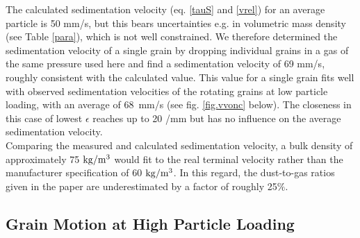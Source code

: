 The calculated sedimentation velocity {(eq. \ref{tauS} and \ref{vrel})} for an average particle is 50 mm/s, but this bears uncertainties e.g. in {volumetric mass density (see Table \ref{para})}, which is not well constrained. We therefore determined the sedimentation velocity of a single grain by dropping individual grains in a gas of the same pressure used here and find a sedimentation velocity of 69 mm/s, roughly consistent with the calculated value. This value for a single grain fits well with observed sedimentation velocities of the rotating grains at low particle loading, with an average of 
68~mm/s (see fig. \ref{fig.vvonc} below). The closeness in this case of lowest $\epsilon$ reaches up to 20 /mm but has no influence on the average sedimentation velocity.\\
{Comparing the measured and calculated sedimentation velocity, a bulk density of approximately 75 $\rm kg / m^3$ would fit to the real terminal velocity rather than the manufacturer specification of 60 $\rm kg / m^3$. In this regard, the dust-to-gas ratios given in the paper are underestimated by a factor of roughly 25$\%$.}




\subsection{Grain Motion at High Particle Loading}

